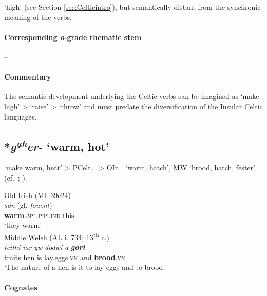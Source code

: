 \documentclass[output=paper,colorlinks,citecolor=brown]{langscibook}
\begin{document}
 ‘high’ (see Section \ref{sec:Celticintro}), but semantically distant from the synchronic meaning of the verbs.

\paragraph*{Corresponding \textit{o}-grade thematic stem}  -- 

\paragraph*{Commentary}

The semantic development underlying the Celtic verbs can be imagined as ‘make high’ > ‘raise’ > ‘throw’ and must predate the diversification of the Insular Celtic languages.

\subsection{*\textit{g\textsuperscript{u̯h}er-} ‘warm, hot’}
\label{sec:Caushot}

 ‘make warm, heat’ > PCelt.\  > OIr.\   ‘warm, hatch’, MW  ‘brood, hatch, fester’ (cf.\ \citealt[146--147]{Schulze-Thulin2001}; ).


\begin{exe}
    \ex Old Irish (Ml. 39c24)\label{ex:Caushot1}\\
         \textit{són} (gl. \textit{fouent}) \\
        \textbf{warm}.\textsc{3pl.prs.ind} this\\
        \glt ‘they warm’\\
    \ex Middle Welsh (AL i. 734; 13\textsuperscript{th} c.)\label{ex:Caushot2}\\
        \gll \textit{teithi} \textit{iar} \textit{yw} \textit{dodwi} \textit{a} \textbf{\textit{gori}}  \\
        traits hen is lay.eggs.\textsc{vn} and \textbf{brood}.\textsc{vn}\\
        \glt ‘The nature of a hen is it to lay eggs and to brood.’\\
\end{exe}

\paragraph*{Cognates}
\end{document}
